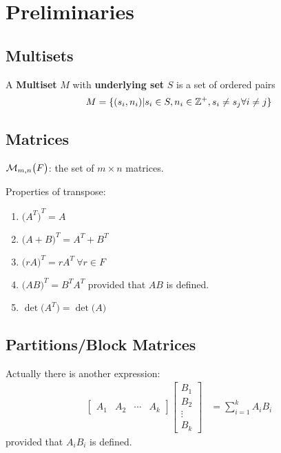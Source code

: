 \documentclass[../main.tex]{subfiles}
\begin{document}
\section{Preliminaries}

\subsection*{Multisets}

A \textbf{Multiset} $M$ with \textbf{underlying set} $S$ is a set of ordered pairs 
\begin{equation*}
    M = \{(s_i, n_i) | s_i \in S, n_i \in \mathbb{Z}^+, s_i \neq s_j \forall i \neq j\}
\end{equation*}

\subsection*{Matrices}

$\mathcal{M}_{m,n}\bigl(F\bigr)$: the set of $m \times n$ matrices.

Properties of transpose:
\begin{enumerate}[label = \arabic*.]
    \item ${\bigl(A^T\bigr)}^T = A$ 
    \item ${\bigl(A+B\bigr)}^T = A^T + B^T$
    \item ${\bigl(rA\bigr)}^T = rA^T~\forall r \in F$
    \item ${\bigl(AB\bigr)}^T = B^T A^T$ provided that $AB$ is defined.
    \item $\det\bigl(A^T\bigr) = \det\bigl(A\bigr)$ 
\end{enumerate}

\subsection*{Partitions/Block Matrices}
Actually there is another expression:
\begin{align*}
    \begin{bmatrix}
        A_1 & A_2 & \cdots & A_k
    \end{bmatrix}
    \begin{bmatrix}
        B_1 \\ B_2 \\ \vdots \\ B_k
    \end{bmatrix} &= \sum_{i=1}^k A_i B_i
\end{align*}
provided that $A_i B_i$ is defined.
\end{document}
